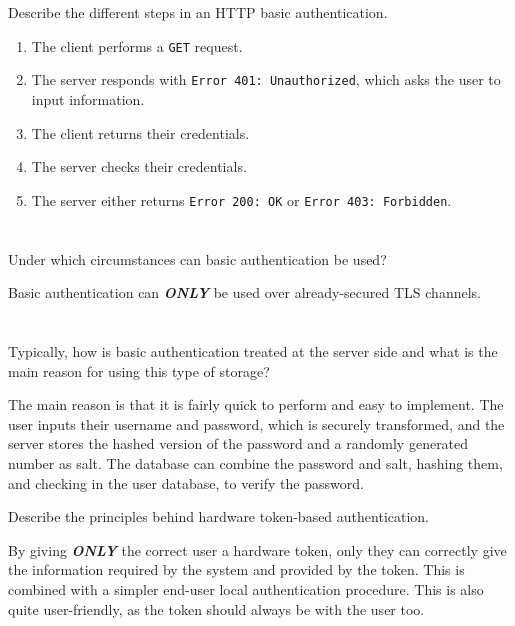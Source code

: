 \begin{questions}
  \begin{parts}
  \part{} Describe the different steps in an HTTP basic authentication.
    \begin{solution}
      \begin{enumerate}[noitemsep]
      \item The client performs a \texttt{GET} request.
      \item The server responds with \texttt{Error 401: Unauthorized}, which asks the user to input information.
      \item The client returns their credentials.
      \item The server checks their credentials.
      \item The server either returns \texttt{Error 200: OK} or \texttt{Error 403: Forbidden}.
      \end{enumerate}
    \end{solution}

  \part{} Under which circumstances can basic authentication be used?
    \begin{solution}
      Basic authentication can \textbf{\emph{ONLY}} be used over already-secured TLS channels.
    \end{solution}

  \part{} Typically, how is basic authentication treated at the server side and what is the main reason for using this type of storage?
    \begin{solution}
      The main reason is that it is fairly quick to perform and easy to implement.
      The user inputs their username and password, which is securely transformed, and the server stores the hashed version of the password and a randomly generated number as salt.
      The database can combine the password and salt, hashing them, and checking in the user database, to verify the password.
    \end{solution}
  \end{parts}

\question{} Describe the principles behind hardware token-based authentication.
  \begin{solution}
    By giving \textbf{\emph{ONLY}} the correct user a hardware token, only they can correctly give the information required by the system and provided by the token.
    This is combined with a simpler end-user local authentication procedure.
    This is also quite user-friendly, as the token should always be with the user too.


\end{solution}
\end{questions}
